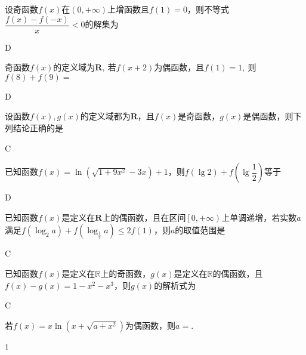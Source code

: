   \begin{exercise}
    \item
      设奇函数$f(x)$在$ \left(0,+\infty\right) $上增函数且$ f(1)=0 $，则不等式$ \dfrac{f(x)-f(-x)}{x}<0 $的解集为\xz
      \begin{answer}
        D
      \end{answer}
    \item
      奇函数$f(x)$的定义域为$ \mathbf{R} ,~$若$ f(x+2) $为偶函数，且$ f(1)=1,~ $则 $f(8)+f(9)=$\xz
      \begin{answer}
        D
      \end{answer}
    \item
      设函数$f(x),g(x)$的定义域都为$\mathbf{R}$，且$f(x)$是奇函数，$g(x)$是偶函数，则下列结论正确的是\xz
      \begin{answer}
        C
      \end{answer}
    \item
      已知函数$f(x)=\ln \left(\sqrt{1+9x^2}-3x\right)+1$，则$ f(\lg2)+f\left(\lg\dfrac{1}{2}\right) $等于\xz
      \begin{answer}
        D
      \end{answer}
    \item
      已知函数$f(x)$是定义在$ \mathbf{R} $上的偶函数，且在区间$ \left[0,+\infty\right) $上单调递增，若实数$ a $满足$ f(\log_2a) +f(\log_\frac{1}{2}a)\le 2f(1)$，则$ a $的取值范围是\xz
      \xx{$ \left[1,2\right]$}{$ \left(0,\dfrac{1}{2}\right]$}{$ \left[\dfrac{1}{2},2\right]$}{$ \left(0,2\right]$}
      \begin{answer}
        C
      \end{answer}
    \item
      已知函数$f(x)$是定义在$\mathbb{R}$上的奇函数，$g(x)$是定义在$\mathbb{R} $的偶函数，且$f(x)-g(x)=1-x^2-x^3 $，则$g(x) $的解析式为\xz
      \begin{answer}
      C
      \end{answer}
    \item
      若$f(x)=x\ln (x+\sqrt{a+x^2})$为偶函数，则$ a= $\tk.
      \begin{answer}
        1
      \end{answer}
  \end{exercise}
\vspace{2em}

